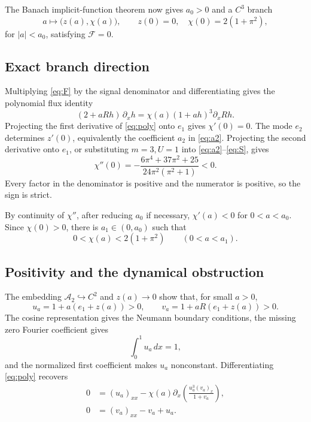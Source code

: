\documentclass[11pt]{article}
\newcommand{\abs}[1]{\left\lvert #1\right\rvert}
\begin{document}
The Banach implicit-function theorem now gives \(a_0>0\) and a \(C^3\)
branch
\[
 a\longmapsto\bigl(z(a),\chi(a)\bigr),
 \qquad
 z(0)=0,\quad \chi(0)=2(1+\pi^2),
\]
for \(\abs a<a_0\), satisfying \(\mathcal F=0\).

\subsection{Exact branch direction}

Multiplying \eqref{eq:F} by the signal denominator and differentiating gives
the polynomial flux identity
\begin{equation}
 (2+aRh)\,\partial_xh
 =\chi(a)(1+ah)^3\partial_xRh.                          \label{eq:poly}
\end{equation}
Projecting the first derivative of \eqref{eq:poly} onto \(e_1\) gives
\(\chi'(0)=0\).  The mode \(e_2\) determines \(z'(0)\), equivalently the
coefficient \(a_2\) in \eqref{eq:a2}.  Projecting the second derivative onto
\(e_1\), or substituting \(m=3,U=1\) into
\eqref{eq:a2}--\eqref{eq:S}, gives
\begin{equation}
 \chi''(0)=
 -\frac{6\pi^4+37\pi^2+25}
 {24\pi^2(\pi^2+1)}<0.                                \label{eq:second}
\end{equation}
Every factor in the denominator is positive and the numerator is positive,
so the sign is strict.

By continuity of \(\chi''\), after reducing \(a_0\) if necessary,
\(\chi'(a)<0\) for \(0<a<a_0\).  Since \(\chi(0)>0\), there is
\(a_1\in(0,a_0)\) such that
\begin{equation}
 0<\chi(a)<2(1+\pi^2)
 \qquad(0<a<a_1).                                      \label{eq:backward}
\end{equation}

\subsection{Positivity and the dynamical obstruction}

The embedding \(\mathcal A_2\hookrightarrow C^2\) and
\(z(a)\to0\) show that, for small \(a>0\),
\[
 u_a=1+a(e_1+z(a))>0,\qquad
 v_a=1+aR(e_1+z(a))>0.
\]
The cosine representation gives the Neumann boundary conditions, the
missing zero Fourier coefficient gives
\[
 \int_0^1u_a\,dx=1,
\]
and the normalized first coefficient makes \(u_a\) nonconstant.
Differentiating \eqref{eq:poly} recovers
\begin{align*}
 0&=(u_a)_{xx}
 -\chi(a)\partial_x\left(\frac{u_a^3(v_a)_x}{1+v_a}\right),\\
 0&=(v_a)_{xx}-v_a+u_a.
\end{align*}
\end{document}
